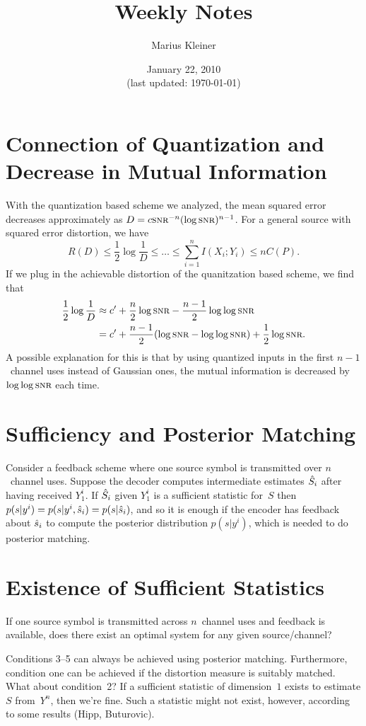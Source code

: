 \documentclass[a4paper]{article}
\title{Weekly Notes}
\author{Marius Kleiner}
\date{January 22, 2010\\\small(last updated: \today)}
\theoremstyle{definition}
\begin{document}
\maketitle

\section{Connection of Quantization and Decrease in Mutual Information}

With the quantization based scheme we analyzed, the mean squared error decreases
approximately as $D = c \snr^{-n}(\log\snr)^{n-1}$. For a general source with
squared error distortion, we have
\begin{equation*}
  R(D) \le \frac12 \log\frac{1}{D} \le \dots \le \sum_{i=1}^n I(X_i;Y_i) \le
  nC(P).
\end{equation*}
If we plug in the achievable distortion of the quanitzation based scheme, we
find that
\begin{align*}
  \frac12 \log\frac1D &\approx c' + \frac n2 \log\snr - \frac{n-1}2 \log\log\snr
  \\
  &= c' + \frac{n-1}2 (\log\snr - \log\log\snr) + \frac12 \log\snr.
\end{align*}
A possible explanation for this is that by using quantized inputs in the first
$n-1$~channel uses instead of Gaussian ones, the mutual information is decreased
by $\log\log\snr$ each time.


\section{Sufficiency and Posterior Matching}

Consider a feedback scheme where one source symbol is transmitted over
$n$~channel uses. Suppose the decoder computes intermediate estimates ${\hat{S}}_i$
after having received $Y_1^i$. If ${\hat{S}}_i$ given $Y_1^i$ is a sufficient
statistic for~$S$ then $p(s|y^i) = p(s|y^i,{\hat{s}}_i) = p(s|{\hat{s}}_i)$, and so it is
enough if the encoder has feedback about ${\hat{s}}_i$ to compute the posterior
distribution $p(s|y^i)$, which is needed to do posterior matching.


\section{Existence of Sufficient Statistics}

If one source symbol is transmitted across $n$~channel uses and feedback is
available, does there exist an optimal system for any given source/channel?

Conditions 3--5 can always be achieved using posterior matching.  Furthermore,
condition one can be achieved if the distortion measure is suitably matched.
What about condition~2? If a sufficient statistic of dimension~$1$ exists to
estimate $S$ from~$Y^n$, then we're fine. Such a statistic might not exist,
however, according to some results (Hipp, Buturovic). 

%
\end{document}
